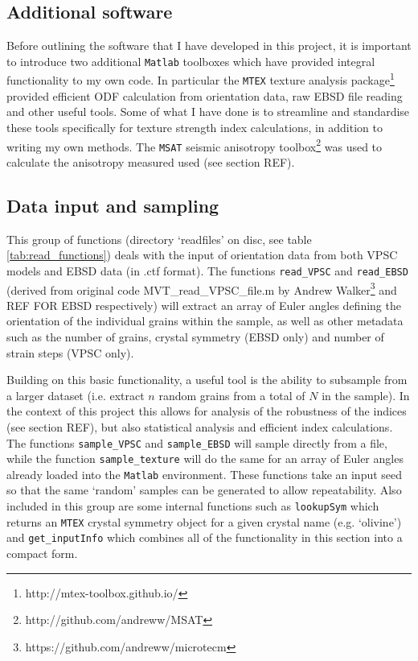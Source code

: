 \documentclass[a4paper,12pt,twoside]{report}
\numberwithin{equation}{chapter}
\begin{document}
\subsection{Additional software}
Before outlining the software that I have developed in this project, it is important to introduce two additional \texttt{Matlab} toolboxes which have provided integral functionality to my own code. In particular the \texttt{MTEX} texture analysis package\footnote{http://mtex-toolbox.github.io/} \citep{Bachmann2010,Mainprice} provided efficient ODF calculation from orientation data, raw EBSD file reading and other useful tools. Some of what I have done is to streamline and standardise these tools specifically for texture strength index calculations, in addition to writing my own methods. The \texttt{MSAT} seismic anisotropy toolbox\footnote{http://github.com/andreww/MSAT} was used to calculate the anisotropy measured used (see section REF).    

\subsection{Data input and sampling}

This group of functions (directory \lq{}readfiles\rq{} on disc, see table \ref{tab:read_functions}) deals with the input of orientation data from both VPSC models and EBSD data (in .ctf format). The functions \texttt{read\_{}VPSC} and \texttt{read\_{}EBSD} (derived from original code MVT\_{}read\_{}VPSC\_{}file.m by Andrew Walker\footnote{https://github.com/andreww/microtecm} and REF FOR EBSD respectively) will extract an array of Euler angles defining the orientation of the individual grains within the sample, as well as other metadata such as the number of grains, crystal symmetry (EBSD only) and number of strain steps (VPSC only).                                                

Building on this basic functionality, a useful tool is the ability to subsample from a larger dataset (i.e. extract $n$ random grains from a total of $N$ in the sample). In the context of this project this allows for analysis of the robustness of the indices (see section REF), but also statistical analysis and efficient index calculations. The functions \texttt{sample\_{}VPSC} and \texttt{sample\_{}EBSD} will sample directly from a file, while the function \texttt{sample\_{}texture} will do the same for an array of Euler angles already loaded into the \texttt{Matlab} environment. These functions take an input seed so that the same \lq{}random\rq{} samples can be generated to allow repeatability. Also included in this group are some internal functions such as \texttt{lookupSym} which returns an \texttt{MTEX} crystal symmetry object \citep{Bachmann2010} for a given crystal name (e.g. \lq{}olivine\rq{}) and \texttt{get\_{}inputInfo} which combines all of the functionality in this section into a compact form.                                                                                                                            
\end{document}
